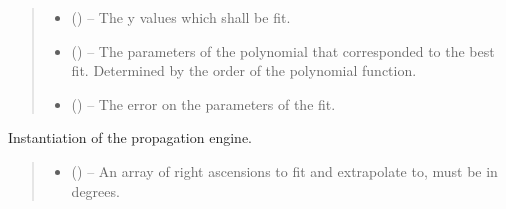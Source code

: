 \documentclass[letterpaper,11pt,english]{sphinxmanual}
\begin{document}
\begin{savenotes}
\begin{fulllineitems}
\begin{savenotes}
\begin{fulllineitems}
\begin{quote}
\begin{description}
\begin{itemize}
\item {} 
\sphinxAtStartPar
{} () – The y values which shall be fit.

\end{itemize}

\sphinxAtStartPar
\begin{itemize}
\item {} 
\sphinxAtStartPar
{} () – The parameters of the polynomial that corresponded to the best fit.
Determined by the order of the polynomial function.

\item {} 
\sphinxAtStartPar
{} () – The error on the parameters of the fit.

\end{itemize}


\end{description}\end{quote}

\end{fulllineitems}\end{savenotes}


\begin{savenotes}\begin{fulllineitems}
\label{\detokenize{code/opihiexarata.propagate.polynomial:opihiexarata.propagate.polynomial.LinearPropagationEngine.__init__}}
\pysigstartsignatures
{}
\pysigstopsignatures
\sphinxAtStartPar
Instantiation of the propagation engine.
\begin{quote}\begin{description}
\begin{itemize}
\item {} 
\sphinxAtStartPar
{} () – An array of right ascensions to fit and extrapolate to, must be in
degrees.


\end{itemize}
\end{description}
\end{quote}
\end{fulllineitems}
\end{savenotes}
\end{fulllineitems}
\end{savenotes}
\end{document}

